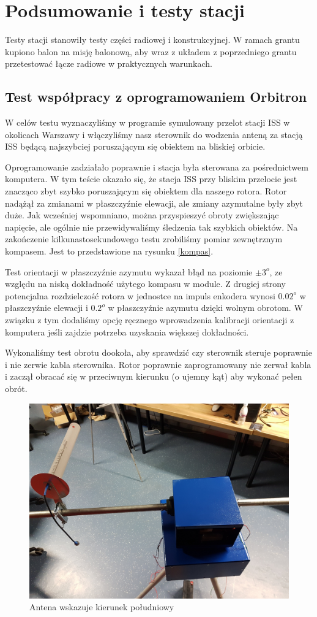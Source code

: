 \section{Podsumowanie i testy stacji}

Testy stacji stanowiły testy części radiowej i konstrukcyjnej. W ramach grantu kupiono balon na misję balonową, aby wraz z układem z poprzedniego grantu przetestować łącze radiowe w praktycznych warunkach.

\subsection{Test współpracy z oprogramowaniem Orbitron}

W celów testu wyznaczyliśmy w programie symulowany przelot stacji ISS w okolicach Warszawy i włączyliśmy nasz sterownik do wodzenia anteną za stacją ISS będącą najszybciej poruszającym się obiektem na bliskiej orbicie.

Oprogramowanie zadziałało poprawnie i stacja była sterowana za pośrednictwem komputera. W tym teście okazało się, że stacja ISS przy bliskim przelocie jest znacząco zbyt szybko poruszającym się obiektem dla naszego rotora. Rotor nadążął za zmianami w płaszczyźnie elewacji, ale zmiany azymutalne były zbyt duże. Jak wcześniej wspomniano, można przyspieszyć obroty zwiększając napięcie, ale ogólnie nie przewidywaliśmy śledzenia tak szybkich obiektów. Na zakończenie kilkunastosekundowego testu zrobiliśmy pomiar zewnętrznym kompasem. Jest to przedstawione na rysunku \ref{kompas}.

Test orientacji w płaszczyźnie azymutu wykazał błąd na poziomie $\pm 3^o$, ze względu na niską dokładność użytego kompasu w module. Z drugiej strony potencjalna rozdzielczość rotora w jednostce na impuls enkodera wynosi $0.02^o$ w płaszczyźnie elewacji i $0.2^o$ w płaszczyźnie azymutu dzięki wolnym obrotom. W związku z tym dodaliśmy opcję ręcznego wprowadzenia kalibracji orientacji z komputera jeśli zajdzie potrzeba uzyskania większej dokładności.

Wykonaliśmy test obrotu dookoła, aby sprawdzić czy sterownik steruje poprawnie i nie zerwie kabla sterownika. Rotor poprawnie zaprogramowany nie zerwał kabla i zaczął obracać się w przeciwnym kierunku (o ujemny kąt) aby wykonać pełen obrót.

\begin{figure}[h]
	\centering
		\includegraphics[width=0.7 \textwidth]{testy/antenaS}
	\caption{Antena wskazuje kierunek południowy}	
	\label{fig:antenaS}
\end{figure}

